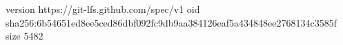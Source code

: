version https://git-lfs.github.com/spec/v1
oid sha256:6b54651ed8ee5ced86dbf092fc9db9aa384126eaf5a434848ee2768134c3585f
size 5482
